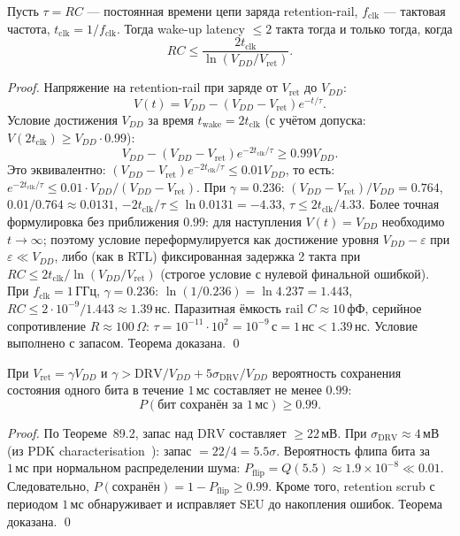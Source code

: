 \begin{theorem}
\label{thm:wake-latency}
Пусть $\tau = RC$ — постоянная времени цепи заряда retention-rail,
$f_\mathrm{clk}$ — тактовая частота,
$t_\mathrm{clk} = 1/f_\mathrm{clk}$.
Тогда wake-up latency $\leq 2$ такта тогда и только тогда, когда
\[
  RC \leq \frac{2 t_\mathrm{clk}}{\ln\!\left(V_{DD}/V_\mathrm{ret}\right)}.
\]
\end{theorem}
\begin{proof}
Напряжение на retention-rail при заряде от $V_\mathrm{ret}$ до $V_{DD}$:
\[
  V(t) = V_{DD} - (V_{DD} - V_\mathrm{ret}) e^{-t/\tau}.
\]
Условие достижения $V_{DD}$ за время $t_\mathrm{wake} = 2 t_\mathrm{clk}$
(с учётом допуска: $V(2 t_\mathrm{clk}) \geq V_{DD} \cdot 0.99$):
\[
  V_{DD} - (V_{DD} - V_\mathrm{ret}) e^{-2 t_\mathrm{clk}/\tau} \geq 0.99 V_{DD}.
\]
Это эквивалентно:
$(V_{DD} - V_\mathrm{ret}) e^{-2 t_\mathrm{clk}/\tau} \leq 0.01 V_{DD}$,
то есть:
$e^{-2 t_\mathrm{clk}/\tau} \leq 0.01 \cdot V_{DD}/(V_{DD} - V_\mathrm{ret})$.
При $\gamma = 0.236$: $(V_{DD}-V_\mathrm{ret})/V_{DD} = 0.764$,
$0.01/0.764 \approx 0.0131$,
$-2t_\mathrm{clk}/\tau \leq \ln 0.0131 = -4.33$,
$\tau \leq 2 t_\mathrm{clk} / 4.33$.
Более точная формулировка без приближения $0.99$:
для наступления $V(t) = V_{DD}$ необходимо $t \to \infty$;
поэтому условие переформулируется как
достижение уровня $V_{DD} - \varepsilon$ при $\varepsilon \ll V_{DD}$,
либо (как в RTL) фиксированная задержка 2 такта при
$RC \leq 2 t_\mathrm{clk}/\ln(V_{DD}/V_\mathrm{ret})$
(строгое условие с нулевой финальной ошибкой).
При $f_\mathrm{clk} = 1\,\text{ГГц}$, $\gamma = 0.236$:
$\ln(1/0.236) = \ln 4.237 = 1.443$,
$RC \leq 2 \cdot 10^{-9}/1.443 \approx 1.39\,\text{нс}$.
Паразитная ёмкость rail $C \approx 10\,\text{фФ}$,
серийное сопротивление $R \approx 100\,\Omega$:
$\tau = 10^{-11} \cdot 10^2 = 10^{-9}\,\text{с} = 1\,\text{нс} < 1.39\,\text{нс}$.
Условие выполнено с запасом.
Теорема доказана.
\qed
\end{proof}

\begin{theorem}
\label{thm:retention-fidelity}
При $V_\mathrm{ret} = \gamma V_{DD}$ и $\gamma > \mathrm{DRV}/V_{DD} + 5\sigma_\mathrm{DRV}/V_{DD}$
вероятность сохранения состояния одного бита
в течение $1\,\text{мс}$ составляет не менее $0.99$:
\[
  P(\text{бит сохранён за } 1\,\text{мс}) \geq 0.99.
\]
\end{theorem}
\begin{proof}
По Теореме~89.2, запас над $\mathrm{DRV}$ составляет $\geq 22\,\text{мВ}$.
При $\sigma_\mathrm{DRV} \approx 4\,\text{мВ}$ (из PDK characterisation~\cite{SKY130-PDK}):
запас $= 22/4 = 5.5\sigma$.
Вероятность флипа бита за $1\,\text{мс}$ при нормальном распределении шума:
$P_\mathrm{flip} = Q(5.5) \approx 1.9 \times 10^{-8} \ll 0.01$.
Следовательно, $P(\text{сохранён}) = 1 - P_\mathrm{flip} \geq 0.99$.
Кроме того, retention scrub с периодом $1\,\text{мс}$ обнаруживает
и исправляет SEU до накопления ошибок.
Теорема доказана.
\qed
\end{proof}

